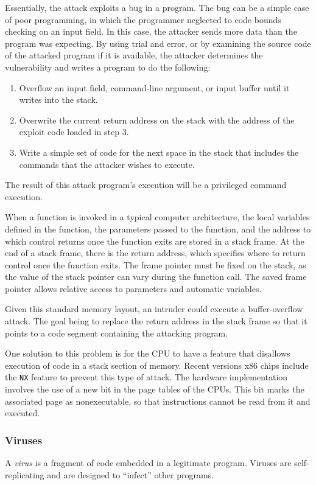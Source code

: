 Essentially, the attack exploits a bug in a program.
The bug can be a simple case of poor programming, in which the programmer neglected to code bounds checking on an input field.
In this case, the attacker sends more data than the program was expecting.
By using trial and error, or by examining the source code of the attacked program if it is available, the attacker determines the vulnerability and writes a program to do the following:
\begin{enumerate}[noitemsep]
\item Overflow an input field, command-line argument, or input buffer until it writes into the stack.
\item Overwrite the current return address on the stack with the address of the exploit code loaded in step 3.
\item Write a simple set of code for the next space in the stack that includes the commands that the attacker wishes to execute.
\end{enumerate}

The result of this attack program’s execution will be a privileged command execution.

When a function is invoked in a typical computer architecture, the local variables defined in the function, the parameters passed to the function, and the address to which control returns once the function exits are stored in a stack frame.
At the end of a stack frame, there is the return address, which specifies where to return control once the function exits.
The frame pointer must be fixed on the stack, as the value of the stack pointer can vary during the function call.
The saved frame pointer allows relative access to parameters and automatic variables.

Given this standard memory layout, an intruder could execute a buffer-overflow attack.
The goal being to replace the return address in the stack frame so that it points to a code segment containing the attacking program.

One solution to this problem is for the CPU to have a feature that disallows execution of code in a stack section of memory.
Recent versions x86 chips include the \texttt{NX} feature to prevent this type of attack.
The hardware implementation involves the use of a new bit in the page tables of the CPUs.
This bit marks the associated page as nonexecutable, so that instructions cannot be read from it and executed.

\subsubsection{Viruses}\label{subsubsec:Viruses}
\begin{definition}[Virus]\label{def:Virus}
  A \emph{virus} is a fragment of code embedded in a legitimate program.
  Viruses are self-replicating and are designed to ``infect'' other programs.
\end{definition}

